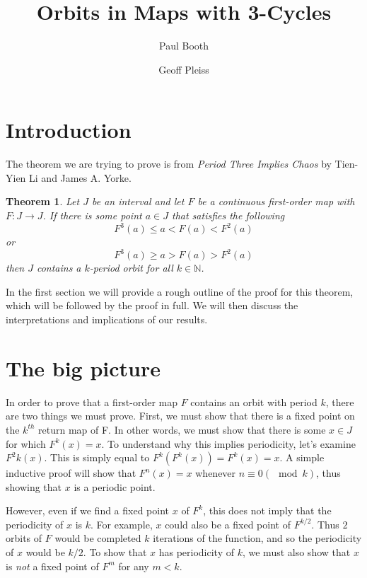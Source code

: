 \documentclass[12pt]{IEEEtran}
\title{Orbits in Maps with 3-Cycles}
\author{
  Paul Booth \\
  \and
  Geoff Pleiss
}
\date{}
\newtheorem{thm}{Theorem}
\begin{document}
  \maketitle



\section{Introduction}

The theorem we are trying to prove is from {\it Period Three Implies Chaos} by Tien-Yien Li and James A. Yorke.

\begin{thm}
\label{thm:mainthm}
	Let $J$ be an interval and let $F$ be a continuous first-order map with $F : J \rightarrow J$. If there is some point $a \in J$ that satisfies the following
	\[ F^3\left(a\right) \leq a < F\left(a\right) < F^2\left(a\right) \]
	or
	\[ F^3\left(a\right) \geq a > F\left(a\right) > F^2\left(a\right) \]
	then $J$ contains a $k$-period orbit for all $k \in \mathbb{N}$.
\end{thm}

In the first section we will provide a rough outline of the proof for this theorem, which will be followed by the proof in full. We will then discuss the interpretations and implications of our results.



\section{The big picture}
\label{stc:thebigpic}

In order to prove that a first-order map $F$ contains an orbit with period $k$, there are two things we must prove. First, we must show that there is a fixed point on the $k^{th}$ return map of F. In other words, we must show that there is some $x \in J$ for which $F^k \left( x \right) = x$. To understand why this implies periodicity, let's examine $F^2k \left( x \right)$. This is simply equal to $F^k \left( F^k \left( x \right) \right) = F^k \left( x \right) = x$. A simple inductive proof will show that $F^n \left( x \right) = x$ whenever $n \equiv 0 \left(\mod k \right)$, thus showing that $x$ is a periodic point.

However, even if we find a fixed point $x$ of $F^k$, this does not imply that the periodicity of $x$ is $k$. For example, $x$ could also be a fixed point of $F^{k/2}$. Thus $2$ orbits of $F$ would be completed $k$ iterations of the function, and so the periodicity of $x$ would be $k/2$. To show that $x$ has periodicity of $k$, we must also show that $x$ is {\it not} a fixed point of $F^m$ for any $m < k$.
\end{document}
